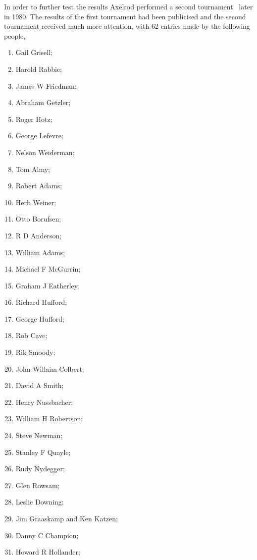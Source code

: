 \documentclass{article}
\theoremstyle{definition}
\begin{document}
In order to further test the results Axelrod performed a second
tournament~\cite{Axelrod1980b} later in 1980. The results of the first tournament
had been publicised and the second tournament received much more attention, with 62 entries
made by the following people,

\begin{multicols}{3}
    \begin{enumerate}
        \item Gail Grisell;
        \item Harold Rabbie;
        \item James W Friedman;
        \item Abraham Getzler;
        \item Roger Hotz;
        \item George Lefevre;
        \item Nelson Weiderman;
        \item Tom Almy;
        \item Robert Adams;
        \item Herb Weiner;
        \item Otto Borufsen;
        \item R D Anderson;
        \item William Adams;
        \item Michael F McGurrin;
        \item Graham J Eatherley;
        \item Richard Hufford;
        \item George Hufford;
        \item Rob Cave;
        \item Rik Smoody;
        \item John Willaim Colbert;
        \item David A Smith;
        \item Henry Nussbacher;
        \item William H Robertson;
        \item Steve Newman;
        \item Stanley F Quayle;
        \item Rudy Nydegger;
        \item Glen Rowsam;
        \item Leslie Downing;
        \item Jim Graaskamp and Ken Katzen;
        \item Danny C Champion;
        \item Howard R Hollander;

\end{enumerate}
\end{multicols}
\end{document}
